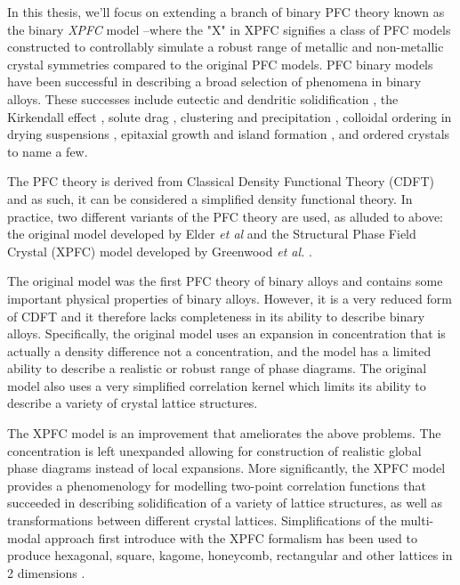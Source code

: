 
In this thesis, we'll focus on extending a branch of binary PFC theory known as
the binary {\it XPFC} model --where the "X" in XPFC signifies a class of PFC
models  constructed to controllably simulate a robust range of metallic and
non-metallic crystal symmetries compared to the original PFC models. PFC binary
models have been successful in describing a broad selection of phenomena in
binary alloys.  These successes include eutectic and dendritic solidification
\cite{ELDER07}, the Kirkendall effect \cite{ELDER11_KIRKENDALL, LU15}, solute
drag \cite{GREENWOOD12}, clustering and precipitation \cite{FALLAH12, FALLAH13,
FALLAH13_AlCu_experiment}, colloidal ordering in drying suspensions
\cite{GANAI13}, epitaxial growth and island formation \cite{ELDER10_NANOISLAND,
LU16}, and ordered crystals \cite{ALSTER17} to name a few. 

The PFC theory is derived from Classical Density Functional Theory (CDFT) and
as such, it can be considered a simplified density functional theory.  In
practice, two different variants of the PFC theory are used, as alluded to
above: the original model developed by Elder \textit{et al} \cite{ELDER07} and
the Structural Phase Field Crystal (XPFC) model developed by Greenwood
\textit{et al.} \cite{GREENWOOD11_BINARY}.

The original model was the first PFC theory of binary alloys and contains some
important physical properties of binary alloys. However, it is a very reduced
form of CDFT and it therefore lacks completeness in its ability to describe
binary alloys. Specifically, the original model uses an expansion in
concentration that is actually a density difference not a concentration, and
the model has a limited ability to describe a realistic or robust range of
phase diagrams. The original model also uses a very simplified correlation
kernel which limits its ability to describe a variety of crystal lattice
structures.

The XPFC model is an improvement that ameliorates the above problems. The
concentration is left unexpanded allowing for construction of realistic global
phase diagrams instead of local expansions. More significantly, the XPFC model
provides a phenomenology for modelling two-point correlation functions that
succeeded in describing solidification of a variety of lattice structures, as
well as transformations between different crystal lattices. Simplifications of
the multi-modal approach first introduce with the XPFC formalism has been used
to produce hexagonal, square, kagome, honeycomb, rectangular and other lattices
in 2 dimensions \cite{MKHONTA13}.

